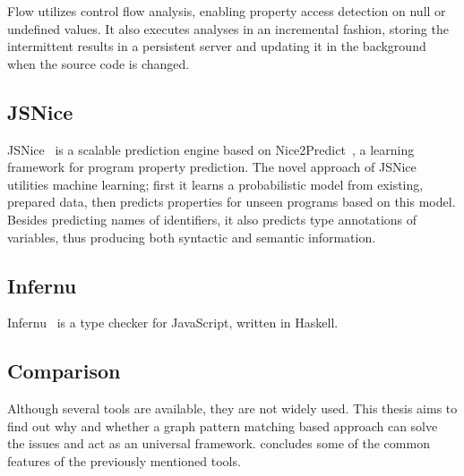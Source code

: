 Flow utilizes control flow analysis, enabling property access detection on null or undefined values. It also executes analyses in an incremental fashion, storing the intermittent results in a persistent server and updating it in the background when the source code is changed.


\subsection{JSNice}
JSNice~\cite{jsnice} is a scalable prediction engine based on Nice2Predict~\cite{nice2predict}, a learning framework for program property prediction. The novel approach of JSNice utilities machine learning; first it learns a probabilistic model from existing, prepared data, then predicts properties for unseen programs based on this model. Besides predicting names of identifiers, it also predicts type annotations of variables, thus producing both syntactic and semantic information.~\cite{jsnice15}

\subsection{Infernu}
Infernu~\cite{infernu} is a type checker for JavaScript, written in Haskell. 


\subsection{Comparison}
Although several tools are available, they are not widely used. This thesis aims to find out why and whether a graph pattern matching based approach can solve the issues and act as an universal framework.  concludes some of the common features of the previously mentioned tools.

